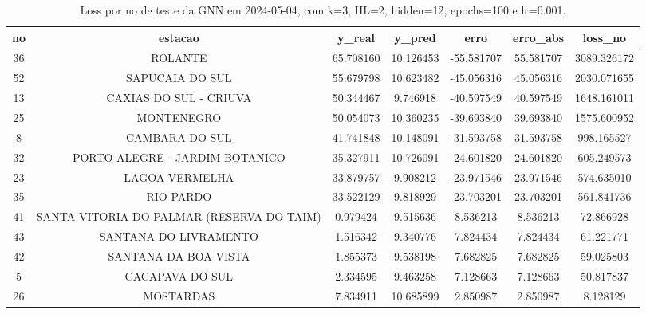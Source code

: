 \begin{table}[h]
\centering
\caption{Loss por no de teste da GNN em 2024-05-04, com k=3, HL=2, hidden=12, epochs=100 e lr=0.001.}
\label{tab:gnn_loss_k3_hl2_h12_e100_d20240504}
\begin{tabular}{ccccccc}
\toprule
no & estacao & y\_real & y\_pred & erro & erro\_abs & loss\_no \\
\midrule
36 & ROLANTE & 65.708160 & 10.126453 & -55.581707 & 55.581707 & 3089.326172 \\
52 & SAPUCAIA DO SUL & 55.679798 & 10.623482 & -45.056316 & 45.056316 & 2030.071655 \\
13 & CAXIAS DO SUL - CRIUVA & 50.344467 & 9.746918 & -40.597549 & 40.597549 & 1648.161011 \\
25 & MONTENEGRO & 50.054073 & 10.360235 & -39.693840 & 39.693840 & 1575.600952 \\
8 & CAMBARA DO SUL & 41.741848 & 10.148091 & -31.593758 & 31.593758 & 998.165527 \\
32 & PORTO ALEGRE - JARDIM BOTANICO & 35.327911 & 10.726091 & -24.601820 & 24.601820 & 605.249573 \\
23 & LAGOA VERMELHA & 33.879757 & 9.908212 & -23.971546 & 23.971546 & 574.635010 \\
35 & RIO PARDO & 33.522129 & 9.818929 & -23.703201 & 23.703201 & 561.841736 \\
41 & SANTA VITORIA DO PALMAR (RESERVA DO TAIM) & 0.979424 & 9.515636 & 8.536213 & 8.536213 & 72.866928 \\
43 & SANTANA DO LIVRAMENTO & 1.516342 & 9.340776 & 7.824434 & 7.824434 & 61.221771 \\
42 & SANTANA DA BOA VISTA & 1.855373 & 9.538198 & 7.682825 & 7.682825 & 59.025803 \\
5 & CACAPAVA DO SUL & 2.334595 & 9.463258 & 7.128663 & 7.128663 & 50.817837 \\
26 & MOSTARDAS & 7.834911 & 10.685899 & 2.850987 & 2.850987 & 8.128129 \\
\bottomrule
\end{tabular}
\end{table}
